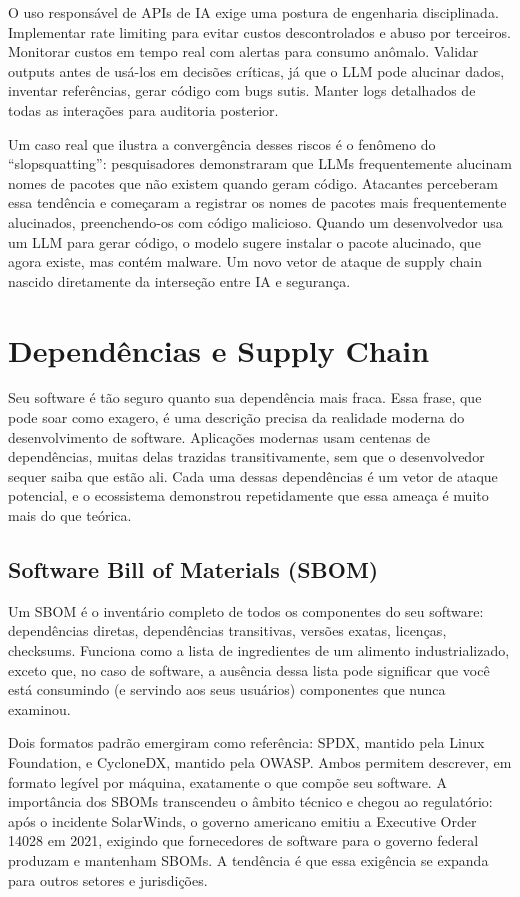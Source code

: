 O uso responsável de APIs de IA exige uma postura de engenharia disciplinada.
Implementar rate limiting para evitar custos descontrolados e abuso por terceiros.
Monitorar custos em tempo real com alertas para consumo anômalo. Validar outputs
antes de usá-los em decisões críticas, já que o LLM pode alucinar dados, inventar
referências, gerar código com bugs sutis. Manter logs detalhados de todas as
interações para auditoria posterior.

Um caso real que ilustra a convergência desses riscos é o fenômeno do
``slopsquatting'': pesquisadores demonstraram que LLMs frequentemente alucinam
nomes de pacotes que não existem quando geram código. Atacantes perceberam essa
tendência e começaram a registrar os nomes de pacotes mais frequentemente
alucinados, preenchendo-os com código malicioso. Quando um desenvolvedor usa um
LLM para gerar código, o modelo sugere instalar o pacote alucinado, que agora
existe, mas contém malware. Um novo vetor de ataque de supply chain nascido
diretamente da interseção entre IA e segurança.

\section{Dependências e Supply Chain}

Seu software é tão seguro quanto sua dependência mais fraca. Essa frase, que pode
soar como exagero, é uma descrição precisa da realidade moderna do
desenvolvimento de software. Aplicações modernas usam centenas de dependências,
muitas delas trazidas transitivamente, sem que o desenvolvedor sequer saiba que
estão ali. Cada uma dessas dependências é um vetor de ataque potencial, e o
ecossistema demonstrou repetidamente que essa ameaça é muito mais do que teórica.

\subsection{Software Bill of Materials (SBOM)}

Um SBOM é o inventário completo de todos os componentes do seu software:
dependências diretas, dependências transitivas, versões exatas, licenças,
checksums. Funciona como a lista de ingredientes de um alimento industrializado,
exceto que, no caso de software, a ausência dessa lista pode significar que
você está consumindo (e servindo aos seus usuários) componentes que nunca examinou.

Dois formatos padrão emergiram como referência: SPDX, mantido pela Linux
Foundation, e CycloneDX, mantido pela OWASP. Ambos permitem descrever, em
formato legível por máquina, exatamente o que compõe seu software. A importância
dos SBOMs transcendeu o âmbito técnico e chegou ao regulatório: após o incidente
SolarWinds, o governo americano emitiu a Executive Order 14028 em 2021, exigindo
que fornecedores de software para o governo federal produzam e mantenham SBOMs. A
tendência é que essa exigência se expanda para outros setores e jurisdições.

